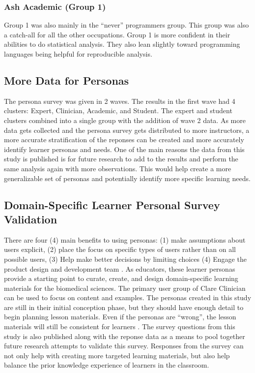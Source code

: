 \documentclass[020-persona\_validation.tex]{subfiles}
\begin{document}
        \subsubsection{Ash Academic (Group 1)}

            Group 1 was also mainly in the ``never'' programmers group.
            This group was also a catch-all for all the other occupations.
            Group 1 is more confident in their abilities to do statistical analysis.
            They also lean slightly toward programming languages being helpful for reproducible analysis.

    \subsection{More Data for Personas}

        The persona survey was given in 2 waves.
        The results in the first wave had 4 clusters: Expert, Clinician, Academic, and Student.
        The expert and student clusters combined into a single group with the addition of wave 2 data.
        As more data gets collected and the persona survey gets distributed to more instructors,
        a more accurate stratification of the reponses can be created and more accurately identify learner personas and needs.
        One of the main reasons the data from this study is published is for future research to add to the results
        and perform the same analysis again with more observations.
        This would help create a more generalizable set of personas and potentially identify more specific learning needs.

    \subsection{Domain-Specific Learner Personal Survey Validation}

        There are four (4) main benefits to using personas:
        (1) make assumptions about users explicit,
        (2) place the focus on specific types of users rather than on all possible users,
        (3) Help make better decisions by limiting choices
        (4) Engage the product design and development team
        \cite{pruittPersonaLifecycleKeeping2006, schwartzParadoxChoiceWhy2016}.
        As educators, these learner personas provide a starting point to curate, create, and design
        domain-specific learning materials for the biomedical sciences.
        The primary user group of Clare Clinician can be used to focus on content and examples.
        The personas created in this study are still in their initial conception phase,
        but they should have enough detail to begin planning lesson materials.
        Even if the personas are ``wrong'',
        the lesson materials will still be consistent for learners
        \cite{pruittPersonaLifecycleKeeping2006}.
        The survey questions from this study is also published along with the reponse data as a means
        to pool together future research attempts to validate this survey.
        Responses from the survey can not only help with creating more targeted learning materials,
        but also help balance the prior knowledge experience of learners in the classroom.
\end{document}
